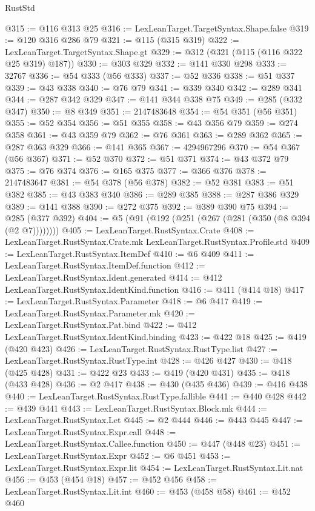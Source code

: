 \begin{lexlean}{RustStd}
\begin{coremodule}
@315 := @116 @313 @25
@316 := LexLeanTarget.TargetSyntax.Shape.false
@319 := @120 @316 @286 @79
@321 := @115 (@315 @319)
@322 := LexLeanTarget.TargetSyntax.Shape.gt
@329 := @312 (@321 (@115 (@116 @322 @25 @319) @187))
@330 := @303 @329
@332 := @141 @330 @298
@333 := 32767
@336 := @54 @333 (@56 @333)
@337 := @52 @336
@338 := @51 @337
@339 := @43 @338
@340 := @76 @79
@341 := @339 @340
@342 := @289 @341
@344 := @287 @342 @329
@347 := @141 @344 @338 @75
@349 := @285 (@332 @347)
@350 := @8 @349
@351 := 2147483648
@354 := @54 @351 (@56 @351)
@355 := @52 @354
@356 := @51 @355
@358 := @43 @356 @79
@359 := @274 @358
@361 := @43 @359 @79
@362 := @76 @361
@363 := @289 @362
@365 := @287 @363 @329
@366 := @141 @365
@367 := 4294967296
@370 := @54 @367 (@56 @367)
@371 := @52 @370
@372 := @51 @371
@374 := @43 @372 @79
@375 := @76 @374
@376 := @165 @375
@377 := @366 @376
@378 := 2147483647
@381 := @54 @378 (@56 @378)
@382 := @52 @381
@383 := @51 @382
@385 := @43 @383 @340
@386 := @289 @385
@388 := @287 @386 @329
@389 := @141 @388
@390 := @272 @375
@392 := @389 @390 @75
@394 := @285 (@377 @392)
@404 := @5 (@91 (@192 (@251 (@267 (@281 (@350 (@8 @394 (@2 @7))))))))
@405 := LexLeanTarget.RustSyntax.Crate
@408 := LexLeanTarget.RustSyntax.Crate.mk LexLeanTarget.RustSyntax.Profile.std
@409 := LexLeanTarget.RustSyntax.ItemDef
@410 := @6 @409
@411 := LexLeanTarget.RustSyntax.ItemDef.function
@412 := LexLeanTarget.RustSyntax.Ident.generated
@414 := @412 LexLeanTarget.RustSyntax.IdentKind.function
@416 := @411 (@414 @18)
@417 := LexLeanTarget.RustSyntax.Parameter
@418 := @6 @417
@419 := LexLeanTarget.RustSyntax.Parameter.mk
@420 := LexLeanTarget.RustSyntax.Pat.bind
@422 := @412 LexLeanTarget.RustSyntax.IdentKind.binding
@423 := @422 @18
@425 := @419 (@420 @423)
@426 := LexLeanTarget.RustSyntax.RustType.list
@427 := LexLeanTarget.RustSyntax.RustType.int
@428 := @426 @427
@430 := @418 (@425 @428)
@431 := @422 @23
@433 := @419 (@420 @431)
@435 := @418 (@433 @428)
@436 := @2 @417
@438 := @430 (@435 @436)
@439 := @416 @438
@440 := LexLeanTarget.RustSyntax.RustType.fallible
@441 := @440 @428
@442 := @439 @441
@443 := LexLeanTarget.RustSyntax.Block.mk
@444 := LexLeanTarget.RustSyntax.Let
@445 := @2 @444
@446 := @443 @445
@447 := LexLeanTarget.RustSyntax.Expr.call
@448 := LexLeanTarget.RustSyntax.Callee.function
@450 := @447 (@448 @23)
@451 := LexLeanTarget.RustSyntax.Expr
@452 := @6 @451
@453 := LexLeanTarget.RustSyntax.Expr.lit
@454 := LexLeanTarget.RustSyntax.Lit.nat
@456 := @453 (@454 @18)
@457 := @452 @456
@458 := LexLeanTarget.RustSyntax.Lit.int
@460 := @453 (@458 @58)
@461 := @452 @460

\end{coremodule}
\end{lexlean}
